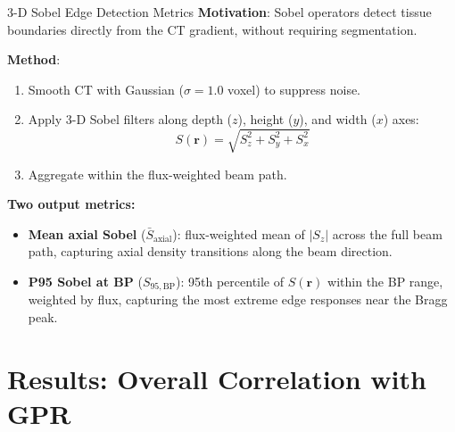 \documentclass[aspectratio=169, 10pt]{beamer}
\begin{document}
\begin{frame}{3-D Sobel Edge Detection Metrics}
  \textbf{Motivation}: Sobel operators detect tissue boundaries directly
  from the CT gradient, without requiring segmentation.

  \vspace{6pt}
  \textbf{Method}:
  \begin{enumerate}
    \item Smooth CT with Gaussian ($\sigma = 1.0$ voxel) to suppress noise.
    \item Apply 3-D Sobel filters along depth ($z$), height ($y$), and
          width ($x$) axes:
          \begin{equation*}
            S(\mathbf{r}) = \sqrt{S_z^2 + S_y^2 + S_x^2}
          \end{equation*}
    \item Aggregate within the flux-weighted beam path.
  \end{enumerate}

  \vspace{6pt}
  \textbf{Two output metrics:}
  \begin{itemize}
    \item \textbf{Mean axial Sobel} ($\bar{S}_{\text{axial}}$): flux-weighted
          mean of $|S_z|$ across the full beam path, capturing axial
          density transitions along the beam direction.
    \item \textbf{P95 Sobel at BP} ($S_{95,\text{BP}}$): 95th percentile of
          $S(\mathbf{r})$ within the BP range, weighted by flux,
          capturing the most extreme edge responses near the Bragg peak.
  \end{itemize}
\end{frame}

\section{Results: Overall Correlation with GPR}
\end{document}
